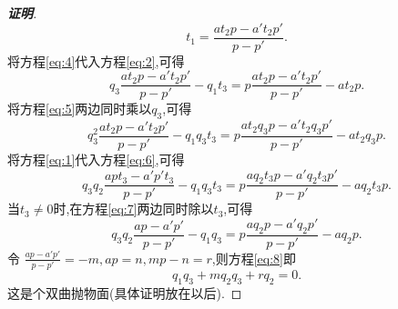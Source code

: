 \documentclass[a4paper]{article}
\begin{document}
\begin{proof}[\textbf{证明}]
\begin{equation}
  \label{eq:4}
  t_1=\frac{at_2p-a't_2p'}{p-p'}.
\end{equation}
将方程\eqref{eq:4}代入方程\eqref{eq:2},可得
\begin{equation}
  \label{eq:5}
  q_3 \frac{at_2p-a't_2p'}{p-p'}-q_1t_3=p\frac{at_2p-a't_2p'}{p-p'} -at_2p.
\end{equation}
将方程\eqref{eq:5}两边同时乘以$q_3$,可得
\begin{equation}
  \label{eq:6}
  q_3^2\frac{at_2p-a't_2p'}{p-p'}-q_1q_3t_3=p \frac{at_2q_3p-a't_2q_3p'}{p-p'}-at_2q_3p.
\end{equation}
将方程\eqref{eq:1}代入方程\eqref{eq:6},可得
\begin{equation}
  \label{eq:7}
    q_3q_{2}\frac{apt_{3}-a'p't_{3}}{p-p'}-q_1q_3t_3=p \frac{aq_{2}t_{3}p-a'q_{2}t_{3}p'}{p-p'}-aq_{2}t_3p.
\end{equation}
当$t_3\neq 0$时,在方程\eqref{eq:7}两边同时除以$t_3$,可得
\begin{equation}
  \label{eq:8}
      q_3q_{2}\frac{ap-a'p'}{p-p'}-q_1q_3=p \frac{aq_{2}p-a'q_{2}p'}{p-p'}-aq_{2}p.
\end{equation}
令 $\frac{ap-a'p'}{p-p'}=-m,ap=n,mp-n=r$,则方程\eqref{eq:8}即
\begin{equation}
  \label{eq:9}
  q_1q_3+mq_{2}q_{3}+rq_2=0.
\end{equation}
这是个双曲抛物面(具体证明放在以后).
\end{proof}
\end{document}
